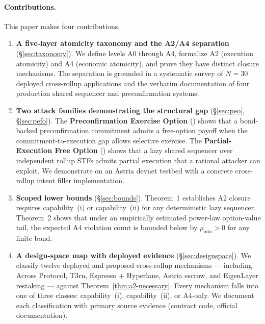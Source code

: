 \paragraph{Contributions.}
This paper makes four contributions.

\begin{enumerate}
  \item \textbf{A five-layer atomicity taxonomy and the A2/A4 separation}
    (§\ref{sec:taxonomy}). We define levels A0 through A4, formalize A2
    (execution atomicity) and A4 (economic atomicity), and prove they have
    distinct closure mechanisms. The separation is grounded in a systematic
    survey of $N=30$ deployed cross-rollup applications and the verbatim
    documentation of four production shared sequencer and preconfirmation
    systems.

  \item \textbf{Two attack families demonstrating the structural gap}
    (§\ref{sec:peo}, §\ref{sec:pefo}). The \textbf{Preconfirmation
    Exercise Option} (\PEO{}) shows that a bond-backed preconfirmation
    commitment admits a free-option payoff when the commitment-to-execution
    gap allows selective exercise. The \textbf{Partial-Execution Free
    Option} (\PEFO{}) shows that a lazy shared sequencer over independent
    rollup STFs admits partial execution that a rational attacker can
    exploit. We demonstrate \PEFO{} on an Astria devnet testbed with a
    concrete cross-rollup intent filler implementation.

  \item \textbf{Scoped lower bounds} (§\ref{sec:bounds}). Theorem~1
    establishes A2 closure requires capability~(i) or capability~(ii) for
    any deterministic lazy sequencer. Theorem~2 shows that under an
    empirically estimated power-law option-value tail, the expected A4
    violation count is bounded below by $\rho_{\min} > 0$ for any finite
    bond.

  \item \textbf{A design-space map with deployed evidence}
    (§\ref{sec:designspace}). We classify twelve deployed and proposed
    cross-rollup mechanisms --- including Across Protocol, T3rn, Espresso +
    Hyperlane, Astria escrow, and EigenLayer restaking --- against
    Theorem~\ref{thm:a2-necessary}. Every mechanism falls into one of
    three classes: capability~(i), capability~(ii), or A4-only. We
    document each classification with primary source evidence (contract
    code, official documentation).
\end{enumerate}

